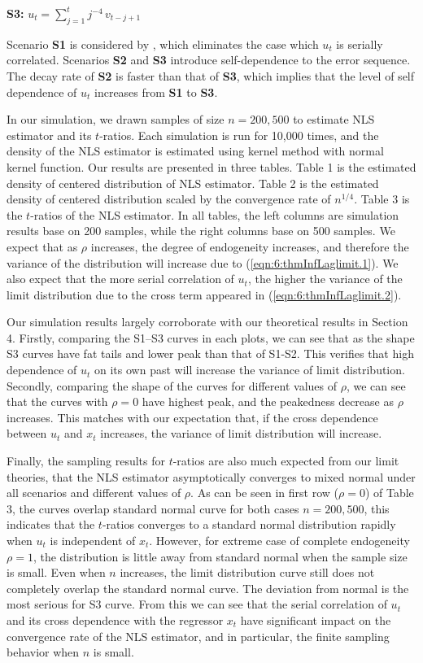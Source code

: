 {\bf S3:} $u_t = \sum_{j = 1}^t j^{-4}\,  v_{t-j+1}$

\medskip
\noindent Scenario {\bf S1} is considered by \cite{changpark2010}, which eliminates the case which $u_t$ is serially correlated. Scenarios {\bf S2} and {\bf S3} introduce self-dependence to the error sequence. The decay rate of {\bf S2} is faster than that of {\bf S3}, which implies that the level of self dependence of $u_t$ increases from {\bf S1} to {\bf S3}.

In our simulation, we drawn samples of size  $n = 200, 500$ to estimate NLS estimator and its $t$-ratios. Each simulation is run for 10,000 times, and the density of the NLS estimator is estimated using kernel method with normal kernel function. Our results are presented in three tables. Table 1 is the estimated density of centered distribution of NLS estimator. Table 2 is the estimated density of centered distribution scaled by the convergence rate of $n^{1/4}$. Table 3 is the $t$-ratios of the NLS estimator. In all tables, the left columns are simulation results base on 200 samples, while the right columns base on 500 samples. We expect that as $\rho$ increases, the degree of endogeneity increases, and therefore the variance of the distribution will increase due to (\ref{eqn:6:thmInfLaglimit.1}). We also expect that the more serial correlation of $u_t$, the higher the variance of the limit distribution  due to the cross term appeared in (\ref{eqn:6:thmInfLaglimit.2}).

Our simulation results largely corroborate with our theoretical results in Section 4. Firstly, comparing the S1--S3 curves in each plots, we can see that as the shape S3 curves have fat tails and lower peak than that of S1-S2. This verifies that high dependence of $u_t$ on its own past will increase the variance of limit distribution. Secondly, comparing the shape of the curves for different values of $\rho$, we can see that the curves with $\rho = 0$ have highest peak, and the peakedness decrease as $\rho$ increases. This matches with our expectation that, if the cross dependence between $u_t$ and $x_t$ increases, the variance of limit distribution will increase.

Finally, the sampling results for $t$-ratios are also much expected from our limit theories, that the NLS estimator asymptotically converges to mixed normal under all scenarios and different values of $\rho$. As can be seen in first row ($\rho = 0$) of Table 3, the curves overlap standard normal curve for both cases $n = 200, 500$, this indicates that the $t$-ratios converges to a standard normal distribution rapidly when $u_t$ is independent of $x_t$. However, for extreme case of complete endogeneity $\rho = 1$, the distribution is little away from standard normal when the sample size is small. Even when $n$ increases, the limit distribution curve still does not completely overlap the standard normal curve. The deviation from normal is the most serious for S3 curve. From this we can see that the serial correlation of $u_t$ and its cross dependence with the regressor $x_t$ have significant impact on the convergence rate of the NLS estimator, and in particular, the finite sampling behavior when $n$ is small.

